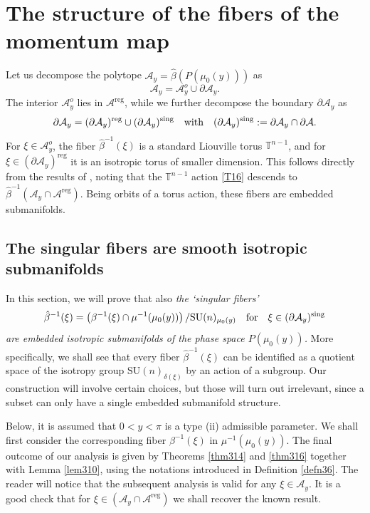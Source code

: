 \documentclass[a4paper,11pt,reqno]{amsart}
\theoremstyle{definition}
\numberwithin{equation}{section}
\newcommand{\be}{\begin{equation}}
\newcommand{\ee}{\end{equation}}
\def\cA{{\mathcal A}}                       %
\def\sing{\mathrm{sing}}                    %
\def\bT{{\mathbb T}}                        %
\def\reg{\mathrm{reg}}                      %
\def\SU{\mathrm{SU}}                        %
\def\reg{\mathrm{reg}}                      %
\begin{document}
\section{The structure of the fibers of the momentum map }\label{Sec3}

Let us decompose the polytope $\cA_y = \hat \beta(P(\mu_0(y)))$ as
\be
\cA_y = \cA_y^o \cup \partial \cA_y.
\label{G30}\ee
The interior $\cA_y^o$ lies in $\cA^\reg$, while we  further decompose
the boundary $\partial \cA_y$ as
\be
\partial \cA_y = (\partial \cA_y)^\reg \cup (\partial \cA_y)^{\sing}
\quad \hbox{with}\quad (\partial \cA_y)^\sing := \partial \cA_y \cap \partial \cA.
\label{G31}\ee
For $\xi \in \cA_y^o$, the fiber $\hat \beta^{-1}(\xi)$ is a standard Liouville torus $\bT^{n-1}$, and
for $\xi \in (\partial \cA_y)^\reg$ it is an isotropic  torus of smaller dimension.
This follows directly from the results of \cite{FK},
noting that the $\bT^{n-1}$ action \eqref{T16} descends to $\hat \beta^{-1}(\cA_y \cap \cA^\reg)$.
Being orbits of a torus action, these fibers are embedded submanifolds.

\subsection{The singular fibers are smooth isotropic submanifolds}\label{Sec31}

In this section, we will prove that also \emph{ the `singular fibers'
\be
\hat \beta^{-1}(\xi) = \left(\beta^{-1}(\xi) \cap \mu^{-1}(\mu_0(y))\right)/\SU(n)_{\mu_0(y)}
\quad \hbox{for}\quad
\xi \in (\partial \cA_y)^\sing
\label{B1}\ee
are embedded isotropic submanifolds of the phase space $P(\mu_0(y))$. }
More specifically, we shall see that
every fiber $\hat \beta^{-1}(\xi)$ can be identified as a quotient space of
the isotropy group $\SU(n)_{\delta(\xi)}$ by an action of  a subgroup.
Our construction will involve certain choices, but those will turn out irrelevant,
since a subset can only have a single embedded submanifold structure.

Below,  it is assumed that $0<y<\pi$ is a type (ii) admissible parameter.
We shall first consider the corresponding fiber $\beta^{-1}(\xi)$ in $\mu^{-1}(\mu_0(y))$.
The final outcome of our analysis is given by Theorems \ref{thm314} and \ref{thm316} together with Lemma \ref{lem310}, using the
notations introduced in Definition \ref{defn36}.
 The reader will notice that the subsequent analysis is valid  for any  $\xi \in \cA_y$.
It is a good check that for  $\xi \in  (\cA_y \cap \cA^\reg)$  we shall recover the known result.
\end{document}
